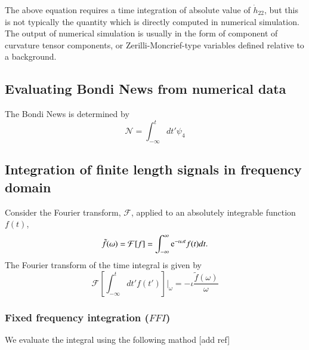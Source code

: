 \documentclass[prd,preprintnumbers,twocolumn,eqsecnum,floatfix,letter]{revtex4}
\begin{document}
The above equation requires a time integration of absolute value of $\dot{h}_{22}$, but this is not typically the quantity which is directly computed in numerical simulation. The output of numerical simulation is usually in the form of component of curvature tensor components, or Zerilli-Moncrief-type variables defined relative to a background. 
\subsection{Evaluating Bondi News from numerical data}
The Bondi News is determined by
\begin{equation}
	\mathcal{N} = \int_{-\infty}^{t}dt' \psi_4
\end{equation}

\subsection{Integration of finite length signals in frequency domain}

Consider the Fourier transform, $\mathcal{F}$, applied to an absolutely integrable function $f(t)$,
\begin{equation}
	\tilde{f}(\omega) = \mathcal{F}[f]=\int_{-\infty}^{\infty}\mathrm{e}^{-\iota \omega t}f(t)dt.	
\end{equation} 
The Fourier transform of the time integral is given by
\begin{equation}
	\mathcal{F}\left[\int_{-\infty}^{t}dt' f(t')\right] |_\omega = -\iota \frac{\tilde{f}(\omega)}{\omega}
\end{equation}

\subsubsection{Fixed frequency integration ($\mathit{FFI}$)}

We evaluate the integral using the following mathod [add ref]
\end{document}
